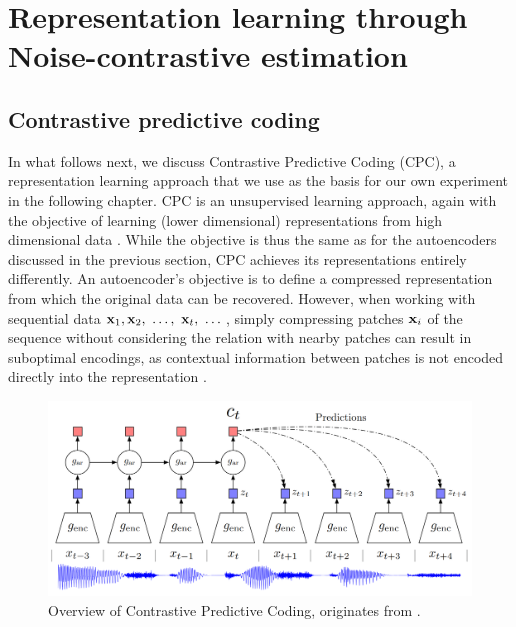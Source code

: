 	
	
	
	
	
	
	
	
	
	



\section{Representation learning through Noise-contrastive estimation} \label{cha:bg_nce}

\subsection{Contrastive predictive coding}

	In what follows next, we discuss Contrastive Predictive Coding (CPC), a representation learning approach that we use as the basis for our own experiment in the following chapter.
	CPC is an unsupervised learning approach, again with the objective of learning (lower dimensional) representations from high dimensional data \cite{oordRepresentationLearningContrastive2019}. While the objective is thus the same as for the autoencoders discussed in the previous section, CPC achieves its representations entirely differently. An autoencoder's objective is to define a compressed representation from which the original data can be recovered. However, when working with sequential data $\mathbf{x}_1,\mathbf{x}_2,~\dots, ~\mathbf{x}_t,~\dots$, simply compressing patches $\mathbf{x}_i$ of the sequence without considering the relation with nearby patches can result in suboptimal encodings, as contextual information between patches is not encoded directly into the representation \cite{shah92LearningGood2020}.


\begin{figure}[h] %
	\centering
	\includegraphics[width=0.7\linewidth]{"cpc overview"}
	\caption{Overview of Contrastive Predictive Coding, originates from \cite{oordRepresentationLearningContrastive2019}.}
	\label{fig:cpc-overview}
\end{figure}

